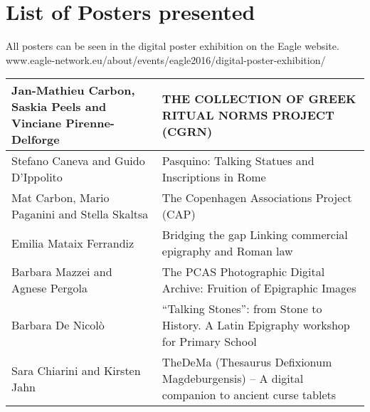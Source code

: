 
\chapter{List of Posters presented}\label{posterslist}

\begin{sloppypar}
All posters can be seen in the digital poster exhibition on the Eagle website.
www.eagle-network.eu/about/events/eagle2016/digital-poster-exhibition/

\end{sloppypar}

\begin{table}
{\small
\addtolength{\tabcolsep}{-0.8mm}

\begin{tabular*}{\textwidth}{p{4.5cm}|p{6cm}}
%    
%    
%
%    
%   
\toprule Jan-Mathieu Carbon, Saskia Peels and Vinciane Pirenne-Delforge & THE COLLECTION OF GREEK RITUAL NORMS PROJECT (CGRN) \\\hline
Stefano Caneva and Guido D'Ippolito & Pasquino: Talking Statues and Inscriptions in Rome\\\hline
Mat Carbon, Mario Paganini and Stella Skaltsa & The Copenhagen Associations Project (CAP)\\\hline
Emilia Mataix Ferrandiz & Bridging the gap Linking commercial epigraphy and Roman law\\\hline
Barbara Mazzei and Agnese Pergola & The PCAS Photographic Digital Archive: Fruition of Epigraphic Images\\\hline
Barbara De Nicolò & “Talking Stones”: from Stone to History. A Latin Epigraphy workshop for Primary School\\\hline
Sara Chiarini and Kirsten Jahn & TheDeMa (Thesaurus Defixionum Magdeburgensis) – A digital companion to ancient curse tablets\\\hline

\end{tabular*}}
\end{table}
